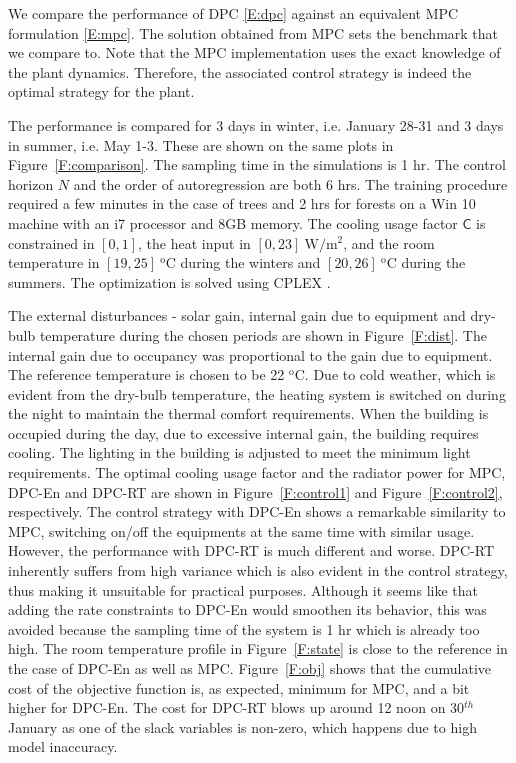 We compare the performance of DPC \eqref{E:dpc} against an equivalent MPC formulation \eqref{E:mpc}. The solution obtained from MPC sets the benchmark that we compare to. Note that the MPC implementation uses the exact knowledge of the plant dynamics. Therefore, the associated control strategy is indeed the optimal strategy for the plant.

The performance is compared for 3 days in winter, i.e. January 28-31 and 3 days in summer, i.e. May 1-3. These are shown on the same plots in Figure~\ref{F:comparison}.
The sampling time in the simulations is 1 hr. The control horizon $N$ and the order of autoregression are both 6 hrs. The training procedure required a few minutes in the case of trees and 2 hrs for forests on a Win 10 machine with an i7 processor and 8GB memory.
The cooling usage factor $\mathsf{C}$ is constrained in $[0,1]$, the heat input in $[0,23]\ \mathrm{W/m^2}$, and the room temperature in $[19,25]\ \mathrm{^oC}$ during the winters and $[20,26]\ \mathrm{^oC}$ during the summers.
The optimization is solved using CPLEX \cite{IBM}.

The external disturbances - solar gain, internal gain due to equipment and dry-bulb temperature during the chosen periods are shown in Figure~\ref{F:dist}. The internal gain due to occupancy was proportional to the gain due to equipment. 
The reference temperature is chosen to be 22 $\mathrm{^oC}$. Due to cold weather, which is evident from the dry-bulb temperature, the heating system is switched on during the night to maintain the thermal comfort requirements. When the building is occupied during the day, due to excessive internal gain, the building requires cooling. The lighting in the building is adjusted to meet the minimum light requirements.
The optimal cooling usage factor and the radiator power for MPC, DPC-En and DPC-RT are shown in Figure~\ref{F:control1} and Figure~\ref{F:control2}, respectively. The control strategy with DPC-En shows a remarkable similarity to MPC, switching on/off the equipments at the same time with similar usage. However, the performance with DPC-RT is much different and worse. DPC-RT inherently suffers from high variance which is also evident in the control strategy, thus making it unsuitable for practical purposes. 
Although it seems like that adding the rate constraints to DPC-En would smoothen its behavior, this was avoided because the sampling time of the system is 1 hr which is already too high. The room temperature profile in Figure~\ref{F:state} is close to the reference in the case of DPC-En as well as MPC. 
Figure~\ref{F:obj} shows that the cumulative cost of the objective function is, as expected, minimum for MPC, and a bit higher for DPC-En. The cost for DPC-RT blows up around 12 noon on 30$^{th}$ January as one of the slack variables is non-zero, which happens due to high model inaccuracy.

